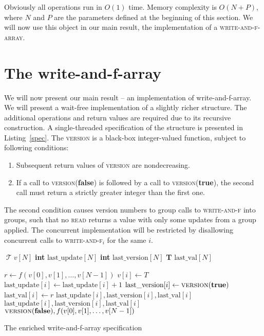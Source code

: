 \documentclass[a4paper,11pt]{article}
\def\T{\ensuremath{\operatorname{\mathcal{T}}}\text{ }}
\newcommand{\fn}[1]{\textsc{#1}}
\begin{document}
Obviously all operations run in $O(1)$ time. Memory complexity is $O(N+P)$, where $N$ and $P$ are the parameters defined at the beginning of this section.
We will now use this object in our main result, the implementation of a \textsc{write-and-f-array}.
\section{The write-and-f-array}

We will now present our main result -- an implementation of write-and-f-array.
We will present a wait-free implementation of a slightly richer structure. The additional operations and return values are required due to its recursive construction.
A single-threaded specification of the structure is presented in Listing~\ref{spec}. The \fn{version} is a black-box integer-valued function, subject to following conditions:
\begin{enumerate}
	\item Subsequent return values of \fn{version} are nondecreasing.
	\item If a call to \fn{version}(\textbf{false}) is followed by a call to \fn{version}(\textbf{true}), the second call must return a strictly greater integer than the first one.
\end{enumerate}
The second condition causes version numbers to group calls to \fn{write-and-f} into groups, such that no \fn{read} returns a value with only some updates from a group applied.
The concurrent implementation will be restricted by disallowing concurrent calls to \fn{write-and-f$_i$} for the same $i$.

\begin{Listing}
\begin{algorithmic}[1]
	\State \T $v[N]$
	\State \textbf{int} $\text{last\_update}[N]$
	\State \textbf{int} $\text{last\_version}[N]$
	\State \textbf{T} $\text{last\_val}[N]$
	
		\State $r \gets f(v[0], v[1],\ldots, v[N-1])$
		\State $v[i] \gets T$
		\State $\text{last\_update}[i] \gets \text{last\_update}[i] + 1$
		\State $\text{last\_version}[i] \gets \fn{version}(\textbf{true})$
		\State $\text{last\_val}[i] \gets r$
		\State \Return $\text{last\_update}[i], \text{last\_version}[i], \text{last\_val}[i]$
	\EndFunction
		\State \Return $\text{last\_update}[i], \text{last\_version}[i], \text{last\_val}[i]$
	\EndFunction
		\State \Return $\fn{version}(\textbf{false}), f(v[0], v[1],\ldots, v[N-1])$
	\EndFunction
\end{algorithmic}
\caption{The enriched write-and-f-array specification}
\label{spec}
\end{Listing}
\end{document}
